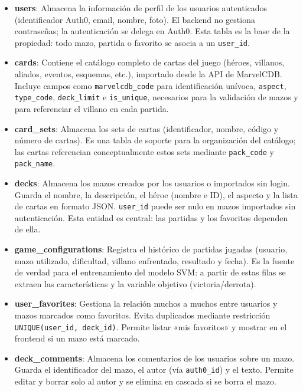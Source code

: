\begin{itemize}
    \item \textbf{users}: Almacena la información de perfil de los usuarios autenticados (identificador Auth0, email, nombre, foto). El backend no gestiona contraseñas; la autenticación se delega en Auth0. Esta tabla es la base de la propiedad: todo mazo, partida o favorito se asocia a un \texttt{user\_id}.
    \item \textbf{cards}: Contiene el catálogo completo de cartas del juego (héroes, villanos, aliados, eventos, esquemas, etc.), importado desde la API de MarvelCDB. Incluye campos como \texttt{marvelcdb\_code} para identificación unívoca, \texttt{aspect}, \texttt{type\_code}, \texttt{deck\_limit} e \texttt{is\_unique}, necesarios para la validación de mazos y para referenciar el villano en cada partida.
    \item \textbf{card\_sets}: Almacena los sets de cartas (identificador, nombre, código y número de cartas). Es una tabla de soporte para la organización del catálogo; las cartas referencian conceptualmente estos sets mediante \texttt{pack\_code} y \texttt{pack\_name}.
    \item \textbf{decks}: Almacena los mazos creados por los usuarios o importados sin login. Guarda el nombre, la descripción, el héroe (nombre e ID), el aspecto y la lista de cartas en formato JSON. \texttt{user\_id} puede ser nulo en mazos importados sin autenticación. Esta entidad es central: las partidas y los favoritos dependen de ella.
    \item \textbf{game\_configurations}: Registra el histórico de partidas jugadas (usuario, mazo utilizado, dificultad, villano enfrentado, resultado y fecha). Es la fuente de verdad para el entrenamiento del modelo SVM: a partir de estas filas se extraen las características y la variable objetivo (victoria/derrota).
    \item \textbf{user\_favorites}: Gestiona la relación muchos a muchos entre usuarios y mazos marcados como favoritos. Evita duplicados mediante restricción \texttt{UNIQUE(user\_id, deck\_id)}. Permite listar «mis favoritos» y mostrar en el frontend si un mazo está marcado.
    \item \textbf{deck\_comments}: Almacena los comentarios de los usuarios sobre un mazo. Guarda el identificador del mazo, el autor (vía \texttt{auth0\_id}) y el texto. Permite editar y borrar solo al autor y se elimina en cascada si se borra el mazo.
\end{itemize}

